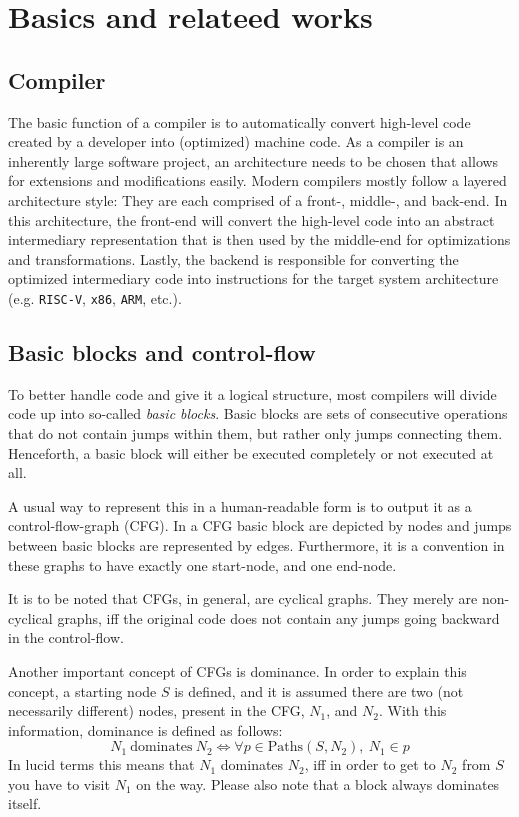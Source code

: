 \chapter{Basics and relateed works}\label{sec:basics}

\section{Compiler}\label{sec:basics:compiler}

The basic function of a compiler is to automatically convert high-level code created by a developer into (optimized) machine code.
As a compiler is an inherently large software project, an architecture needs to be chosen that allows for extensions and modifications easily.
Modern compilers mostly follow a layered architecture style: They are each comprised of a front-, middle-, and back-end.
In this architecture, the front-end will convert the high-level code into an abstract intermediary representation that is then used by the middle-end for optimizations and transformations.
Lastly, the backend is responsible for converting the optimized intermediary code into instructions for the target system architecture (e.g. \texttt{RISC-V}, \texttt{x86}, \texttt{ARM}, etc.).

\section{Basic blocks and control-flow}\label{sec:basics:bb-cf}

To better handle code and give it a logical structure, most compilers will divide code up into so-called \textit{basic blocks}.
Basic blocks are sets of consecutive operations that do not contain jumps within them, but rather only jumps connecting them.
Henceforth, a basic block will either be executed completely or not executed at all.

A usual way to represent this in a human-readable form is to output it as a control-flow-graph (CFG).
In a CFG basic block are depicted by nodes and jumps between basic blocks are represented by edges.
Furthermore, it is a convention in these graphs to have exactly one start-node, and one end-node.

It is to be noted that CFGs, in general, are cyclical graphs.
They merely are non-cyclical graphs, iff the original code does not contain any jumps going backward in the control-flow.

Another important concept of CFGs is dominance.
In order to explain this concept, a starting node $S$ is defined, and it is assumed there are two (not necessarily different) nodes, present in the CFG, $N_1$, and $N_2$.
With this information, dominance is defined as follows:
$$N_1~\text{dominates}~N_2 \Longleftrightarrow \forall p \in \text{Paths}(S, N_2),~N_1 \in p$$
In lucid terms this means that $N_1$ dominates $N_2$, iff in order to get to $N_2$ from $S$ you have to visit $N_1$ on the way.
Please also note that a block always dominates itself.

